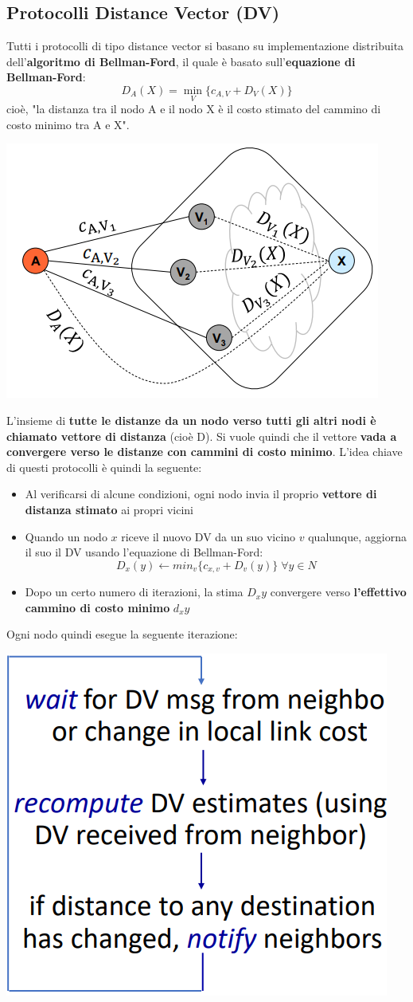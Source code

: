 \documentclass[12pt]{article}
\begin{document}
\subsection{Protocolli Distance Vector (DV)}
Tutti i protocolli di tipo distance vector si basano su implementazione distribuita dell'\textbf{algoritmo di Bellman-Ford}, il quale è basato sull'\textbf{equazione di Bellman-Ford}:
$$D_A(X) = \min_{V}\{c_{A,V} + D_V(X)\}$$
cioè, "la distanza tra il nodo A e il nodo X è il costo stimato del cammino di costo minimo tra A e X".
\begin{center}
    \includegraphics[width =0.50\linewidth]{Images/99.png}
\end{center}
L'insieme di \textbf{tutte le distanze da un nodo verso tutti gli altri nodi è chiamato vettore di distanza} (cioè D). Si vuole quindi che il vettore \textbf{vada a convergere verso le distanze con cammini di costo minimo}.
L'idea chiave di questi protocolli è quindi la seguente:
\begin{itemize}
    \item Al verificarsi di alcune condizioni, ogni nodo invia il proprio \textbf{vettore di distanza stimato} ai propri vicini
    \item Quando un nodo $x$ riceve il nuovo DV da un suo vicino $v$ qualunque, aggiorna il suo il DV usando l'equazione di Bellman-Ford:
    $$D_x(y) \gets min_v\{c_{x,v} + D_v(y)\} \; \forall y \in N$$
    \item Dopo un certo numero di iterazioni, la stima $D_x{y}$ convergere verso \textbf{l'effettivo cammino di costo minimo} $d_x{y}$
\end{itemize}
Ogni nodo quindi esegue la seguente iterazione:
\begin{center}
    \includegraphics[width =0.45\linewidth]{Images/100.png}
\end{center}
\end{document}

